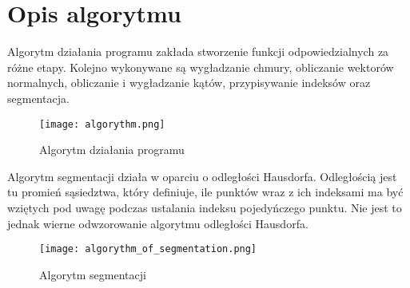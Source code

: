 	\chapter{Opis algorytmu}
	Algorytm działania programu zakłada stworzenie funkcji odpowiedzialnych za różne etapy. Kolejno wykonywane są wygładzanie chmury, obliczanie wektorów normalnych, obliczanie i wygładzanie kątów, przypisywanie indeksów oraz segmentacja.\\
	
	\begin{figure}[h!]
		\centering
		\texttt{[image: algorythm.png]}
		\caption{Algorytm działania programu}
		\label{fig:algorythm}
	\end{figure}
	
	Algorytm segmentacji działa w oparciu o odległości Hausdorfa. Odległością jest tu promień sąsiedztwa, który definiuje, ile punktów wraz z ich indeksami ma być wziętych pod uwagę podczas ustalania indeksu pojedyńczego punktu. Nie jest to jednak wierne odwzorowanie algorytmu odległości Hausdorfa\cite{pomerleau:hal-01178661}.\\
	
	\begin{figure}[h!]
		\centering
		\texttt{[image: algorythm\_of\_segmentation.png]}
		\caption{Algorytm segmentacji}
		\label{fig:algorythm_of_segmentation}
	\end{figure}